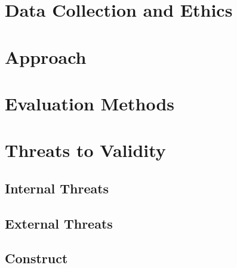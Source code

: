 % 

\section{Data Collection and Ethics}

\section{Approach}

\section{Evaluation Methods}

\section{Threats to Validity}

\subsection{Internal Threats}

\subsection{External Threats}

\subsection{Construct}